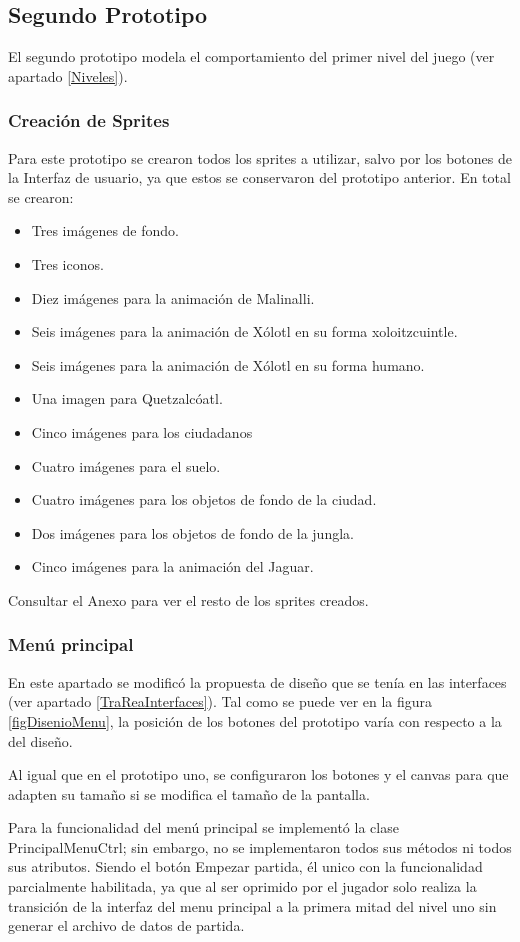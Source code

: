 \subsection{Segundo Prototipo}
El segundo prototipo modela el comportamiento del primer nivel del juego (ver 
apartado \ref{Niveles}). 

\subsubsection{Creación de Sprites}
Para este prototipo se crearon todos los sprites a utilizar, salvo por los botones 
de la Interfaz de usuario, ya que estos se conservaron del prototipo anterior. En 
total se crearon:
\begin{itemize}
	\item Tres imágenes de fondo.
	\item Tres iconos.
	\item Diez imágenes para la animación de Malinalli.
	\item Seis imágenes para la animación de Xólotl en su forma xoloitzcuintle.
	\item Seis imágenes para la animación de Xólotl en su forma humano.
	\item Una imagen para Quetzalcóatl.
	\item Cinco imágenes para los ciudadanos
	\item Cuatro imágenes para el suelo.
	\item Cuatro imágenes para los objetos de fondo de la ciudad.
	\item Dos imágenes para los objetos de fondo de la jungla.
	\item Cinco imágenes para la animación del Jaguar.
\end{itemize}  
Consultar el Anexo para ver el resto de los sprites creados.

\subsubsection{Menú principal}
En este apartado se modificó la propuesta de diseño que se tenía en las interfaces 
(ver apartado \ref{TraReaInterfaces}). Tal como se puede ver en la figura 
\ref{figDisenioMenu}, la posición de los botones del prototipo varía con 
respecto a la del diseño. 
\\
\par
Al igual que en el prototipo uno, se configuraron los botones y el 
canvas para que adapten su tamaño si se modifica el tamaño de la 
pantalla.
\\
\par
Para la funcionalidad del menú principal se implementó la clase PrincipalMenuCtrl; 
sin embargo, no se implementaron todos sus métodos ni todos sus atributos. Siendo 
el botón Empezar partida, él unico con la funcionalidad parcialmente habilitada, 
ya que al ser oprimido por el jugador solo realiza la transición de la interfaz del 
menu principal a la primera mitad del nivel uno sin generar el archivo de datos 
de partida.
\\
\par

